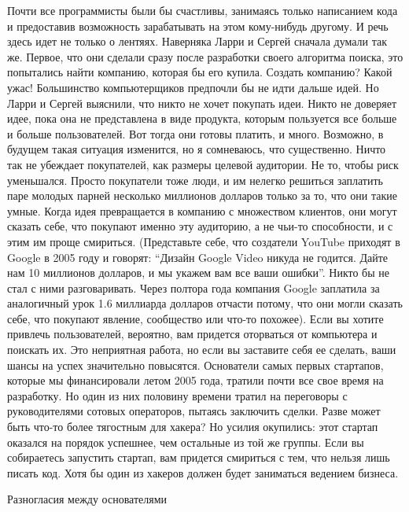 \documentclass[ebook,12pt,oneside,openany]{memoir}
\begin{document}
Почти все программисты были бы счастливы, занимаясь только написанием
кода и предоставив возможность зарабатывать на этом кому-нибудь
другому. И речь здесь идет не только о лентяях. Наверняка Ларри и
Сергей сначала думали так же. Первое, что они сделали сразу после
разработки своего алгоритма поиска, это попытались найти компанию,
которая бы его купила. Создать компанию? Какой ужас! Большинство
компьютерщиков предпочли бы не идти дальше идей. Но Ларри и Сергей
выяснили, что никто не хочет покупать идеи. Никто не доверяет идее,
пока она не представлена в виде продукта, которым пользуется все
больше и больше пользователей. Вот тогда они готовы платить, и много.
Возможно, в будущем такая ситуация изменится, но я сомневаюсь, что
существенно. Ничто так не убеждает покупателей, как размеры целевой
аудитории. Не то, чтобы риск уменьшался. Просто покупатели тоже люди,
и им нелегко решиться заплатить паре молодых парней несколько
миллионов долларов только за то, что они такие умные. Когда идея
превращается в компанию с множеством клиентов, они могут сказать себе,
что покупают именно эту аудиторию, а не чьи-то способности, и с этим
им проще смириться. (Представьте себе, что создатели YouTube приходят
в Google в 2005 году и говорят: “Дизайн Google Video никуда не
годится. Дайте нам 10 миллионов долларов, и мы укажем вам все ваши
ошибки”. Никто бы не стал с ними разговаривать. Через полтора года
компания Google заплатила за аналогичный урок 1.6 миллиарда долларов
отчасти потому, что они могли сказать себе, что покупают явление,
сообщество или что-то похожее). Если вы хотите привлечь пользователей,
вероятно, вам придется оторваться от компьютера и поискать их. Это
неприятная работа, но если вы заставите себя ее сделать, ваши шансы на
успех значительно повысятся. Основатели самых первых стартапов,
которые мы финансировали летом 2005 года, тратили почти все свое время
на разработку. Но один из них половину времени тратил на переговоры с
руководителями сотовых операторов, пытаясь заключить сделки. Разве
может быть что-то более тягостным для хакера? Но усилия окупились:
этот стартап оказался на порядок успешнее, чем остальные из той же
группы. Если вы собираетесь запустить стартап, вам придется смириться
с тем, что нельзя лишь писать код. Хотя бы один из хакеров должен
будет заниматься ведением бизнеса.

Разногласия между основателями
\end{document}
